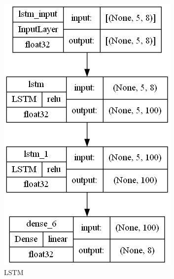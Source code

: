 \documentclass[a4paper,12pt]{report}
\theoremstyle{definitionNODot}
\begin{document}
\begin{figure}[H]
\begin{subfigure}[b]{0.3\textwidth}
			\includegraphics[width=\textwidth]{plot_model_lstm_model.png}
			\caption{LSTM}
			\label{fig:plot_model_lstm_model}
		\end{subfigure}
		\hfill
		\begin{subfigure}[b]{0.3\textwidth}
			\centering

\end{subfigure}
\end{figure}
\end{document}
